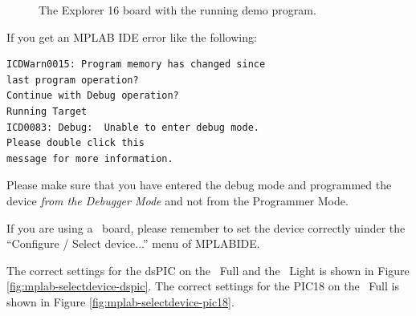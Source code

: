 \begin{figure}[htb]
\caption{The Explorer 16 board with the running demo program.}
\label{fig:explorer16running}
\end{figure}

\begin{note}
If you get an MPLAB IDE error like the following:

\begin{lstlisting}
ICDWarn0015: Program memory has changed since 
last program operation?
Continue with Debug operation?
Running Target
ICD0083: Debug:  Unable to enter debug mode.  
Please double click this
message for more information.
\end{lstlisting}

Please make sure that you have entered the debug mode and programmed the 
device {\em from the Debugger Mode} and not from the Programmer Mode.
\end{note}

\begin{note}
If you are using a \flex\ board, please remember to set the device
correctly uinder the ``Configure / Select device...'' menu of
MPLABIDE.

The correct settings for the dsPIC on the \flex\ Full and the \flex\
Light is shown in Figure \ref{fig:mplab-selectdevice-dspic}. The
correct settings for the PIC18 on the \flex\ Full is shown in Figure
\ref{fig:mplab-selectdevice-pic18}.
\end{note}


